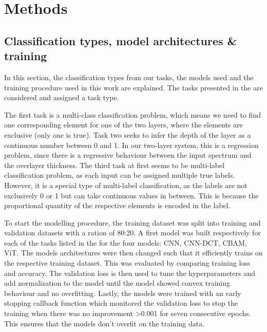 
\chapter{Methods} %

\label{Chapter3} %







\section{Classification types, model architectures \& training}
In this section, the classification types from our tasks, the models used and the training procedure used in this work are explained.
The tasks presented in the  are considered and assigned a task type.

The first task is a multi-class classification problem, which means we need to find one corresponding element for one of the two layers, where the elements are exclusive (only one is true). Task two seeks to infer the depth of the layer as a continuous number between 0 and 1. In our two-layer system, this is a regression problem, since there is a regressive behaviour between the input spectrum and the overlayer thickness. 
The third task at first seems to be multi-label classification problem, as each input can be assigned multiple true labels. However, it is a special type of multi-label classification, as the labels are not exclusively 0 or 1 but can take continuous values in between. This is because the proportional quantity of the respective elements is encoded in the label. 


To start the modelling procedure, the training dataset was split into training and validation datasets with a ration of 80:20. A first model was built respectively for each of the tasks listed in the  for the four models: CNN, CNN-DCT, CBAM, ViT. The models architectures were then changed such that it efficiently trains on the respective training dataset. This was evaluated by comparing training loss and accuracy.
The validation loss is then used to tune the hyperparameters and add normalization to the model until the model showed convex training behaviour and no overfitting. Lastly, the models were trained with an early stopping callback function which monitored the validation loss to stop the training when there was no improvement >0.001 for seven consecutive epochs. This ensures that the models don't overfit on the training data.

